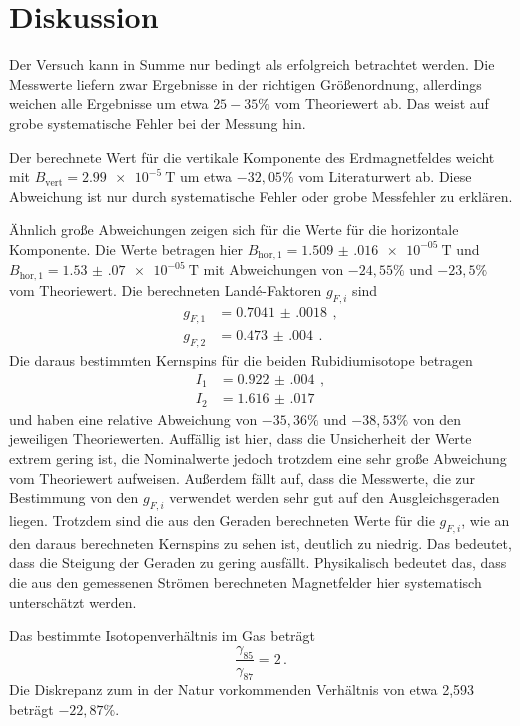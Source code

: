 \newpage
\section{Diskussion}
\label{sec:Diskussion}

Der Versuch kann in Summe nur bedingt als erfolgreich betrachtet werden. Die Messwerte
liefern zwar Ergebnisse in der richtigen Größenordnung, allerdings weichen alle Ergebnisse um
etwa $25-35\%$ vom Theoriewert ab. Das weist auf grobe systematische Fehler bei der Messung hin.

Der berechnete Wert für die vertikale Komponente des Erdmagnetfeldes weicht mit
$B_{\text{vert}}=\SI{2.99e-5}{\tesla}$ um etwa $-32{,}05\%$ vom Literaturwert ab. Diese Abweichung
ist nur durch systematische Fehler oder grobe Messfehler zu erklären.

Ähnlich große Abweichungen zeigen sich für die Werte für die horizontale Komponente.
Die Werte betragen hier $B_{\text{hor},1}=\SI{1.509(016)e-05}{\tesla}$ und
$B_{\text{hor},1}=\SI{1.53(07)e-05}{\tesla}$ mit Abweichungen von $-24{,}55\%$ und $-23{,}5\%$
vom Theoriewert. Die berechneten Landé-Faktoren $g_{F,i}$ sind
\begin{align*}
  g_{F,1}&= \SI{0.7041(0018)}{}\,,\\
  g_{F,2}&= \SI{0.473(004)}{}\,.
\end{align*}
Die daraus bestimmten Kernspins für die beiden Rubidiumisotope betragen
\begin{align*}
  I_1&= \SI{0.922(004)}{}\,,\\
  I_2&= \SI{1.616(017)}{}
\end{align*}
und haben eine relative Abweichung von $-35{,}36\%$ und $-38{,}53\%$ von den jeweiligen
Theoriewerten. Auffällig ist hier, dass die Unsicherheit der Werte extrem gering ist,
die Nominalwerte jedoch trotzdem eine sehr große Abweichung vom Theoriewert aufweisen.
Außerdem fällt auf, dass die Messwerte, die zur Bestimmung von den $g_{F,i}$ verwendet werden
sehr gut auf den Ausgleichsgeraden liegen. Trotzdem sind die aus den Geraden berechneten Werte
für die $g_{F,i}$, wie an den daraus berechneten Kernspins zu sehen ist, deutlich zu niedrig.
Das bedeutet, dass die Steigung der Geraden zu gering ausfällt. Physikalisch bedeutet das, dass
die aus den gemessenen Strömen berechneten Magnetfelder hier systematisch unterschätzt werden.

Das bestimmte Isotopenverhältnis im Gas beträgt
\begin{equation}
  \frac{\gamma_{85}}{\gamma_{87}}= 2 \,.
\end{equation}
Die Diskrepanz zum in der Natur vorkommenden Verhältnis von
etwa 2{,}593 beträgt $-22{,}87\%$.

